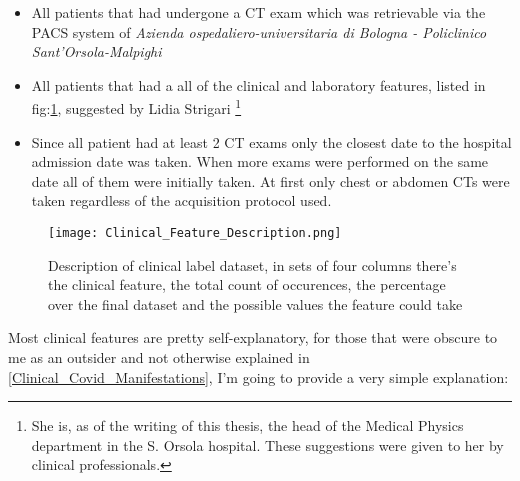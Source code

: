 \begin{itemize}
\item All patients that had undergone a CT exam which was retrievable via the PACS system of \textit{Azienda ospedaliero-universitaria di Bologna - Policlinico Sant'Orsola-Malpighi}
\item All patients that had a all of the clinical and laboratory features, listed in fig:\ref{fig:ClinicalFeatures}, suggested by Lidia Strigari \footnote{She is, as of the writing of this thesis, the head of the Medical Physics department in the S. Orsola hospital. These suggestions were given to her by clinical professionals.}
\item Since all patient had at least 2 CT exams only the closest date to the hospital admission date was taken. When more exams were performed on the same date all of them were initially taken. At first only chest or abdomen CTs were taken regardless of the acquisition protocol used.
\end{itemize}

\begin{figure}[H]
  		\texttt{[image: Clinical\_Feature\_Description.png]}
        \caption{Description of clinical label dataset, in sets of four columns there's the clinical feature, the total count of occurences, the percentage over the final dataset and the possible values the feature could take \label{fig:ClinicalFeatures}}
\end{figure}

Most clinical features are pretty self-explanatory, for those that were obscure to me as an outsider and not otherwise explained in \ref{Clinical_Covid_Manifestations}, I'm going to provide a very simple explanation:

